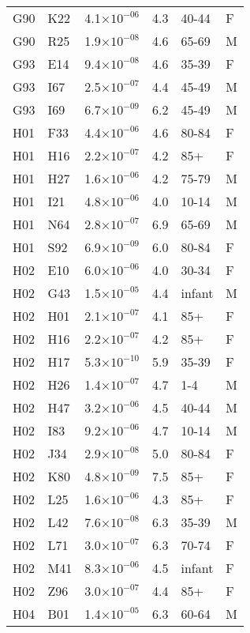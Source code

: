\begin{longtable}{lllrll}
   G90 & K22 & 4.1$\times10^{-06}$ & 4.3 & 40-44 & F \\ 
   G90 & R25 & 1.9$\times10^{-08}$ & 4.6 & 65-69 & M \\ 
   G93 & E14 & 9.4$\times10^{-08}$ & 4.6 & 35-39 & F \\ 
   G93 & I67 & 2.5$\times10^{-07}$ & 4.4 & 45-49 & M \\ 
   G93 & I69 & 6.7$\times10^{-09}$ & 6.2 & 45-49 & M \\ 
   H01 & F33 & 4.4$\times10^{-06}$ & 4.6 & 80-84 & F \\ 
   H01 & H16 & 2.2$\times10^{-07}$ & 4.2 & 85+ & F \\ 
   H01 & H27 & 1.6$\times10^{-06}$ & 4.2 & 75-79 & M \\ 
   H01 & I21 & 4.8$\times10^{-06}$ & 4.0 & 10-14 & M \\ 
   H01 & N64 & 2.8$\times10^{-07}$ & 6.9 & 65-69 & M \\ 
   H01 & S92 & 6.9$\times10^{-09}$ & 6.0 & 80-84 & F \\ 
   H02 & E10 & 6.0$\times10^{-06}$ & 4.0 & 30-34 & F \\ 
   H02 & G43 & 1.5$\times10^{-05}$ & 4.4 & infant & M \\ 
   H02 & H01 & 2.1$\times10^{-07}$ & 4.1 & 85+ & F \\ 
   H02 & H16 & 2.2$\times10^{-07}$ & 4.2 & 85+ & F \\ 
   H02 & H17 & 5.3$\times10^{-10}$ & 5.9 & 35-39 & F \\ 
   H02 & H26 & 1.4$\times10^{-07}$ & 4.7 & 1-4 & M \\ 
   H02 & H47 & 3.2$\times10^{-06}$ & 4.5 & 40-44 & M \\ 
   H02 & I83 & 9.2$\times10^{-06}$ & 4.7 & 10-14 & M \\ 
   H02 & J34 & 2.9$\times10^{-08}$ & 5.0 & 80-84 & F \\ 
   H02 & K80 & 4.8$\times10^{-09}$ & 7.5 & 85+ & F \\ 
   H02 & L25 & 1.6$\times10^{-06}$ & 4.3 & 85+ & F \\ 
   H02 & L42 & 7.6$\times10^{-08}$ & 6.3 & 35-39 & M \\ 
   H02 & L71 & 3.0$\times10^{-07}$ & 6.3 & 70-74 & F \\ 
   H02 & M41 & 8.3$\times10^{-06}$ & 4.5 & infant & F \\ 
   H02 & Z96 & 3.0$\times10^{-07}$ & 4.4 & 85+ & F \\ 
   H04 & B01 & 1.4$\times10^{-05}$ & 6.3 & 60-64 & M \\ 

\end{longtable}
